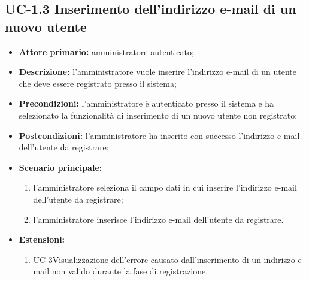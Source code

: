 \subsection{UC-1.3 Inserimento dell'indirizzo e-mail di un nuovo utente}
\begin{itemize}
	\item \textbf{Attore primario:} amministratore autenticato;

	\item \textbf{Descrizione:} l'amministratore vuole inserire l'indirizzo e-mail di un utente che deve essere registrato presso il sistema;

	\item \textbf{Precondizioni:} l'amministratore è autenticato presso il sistema e ha selezionato la funzionalità di inserimento di un nuovo utente non registrato;

	\item \textbf{Postcondizioni:} l'amministratore ha inserito con successo l'indirizzo e-mail dell'utente da registrare;

	\item \textbf{Scenario principale:}
	      \begin{enumerate}
		      \item l'amministratore seleziona il campo dati in cui inserire l'indirizzo e-mail dell'utente da registrare;
		      \item l'amministratore inserisce l'indirizzo e-mail dell'utente da registrare.
	      \end{enumerate}

	\item \textbf{Estensioni:}
	      \begin{enumerate}
		      \item UC-3Visualizzazione dell'errore causato dall'inserimento di un indirizzo e-mail non valido durante la fase di registrazione.
	      \end{enumerate}
\end{itemize}
